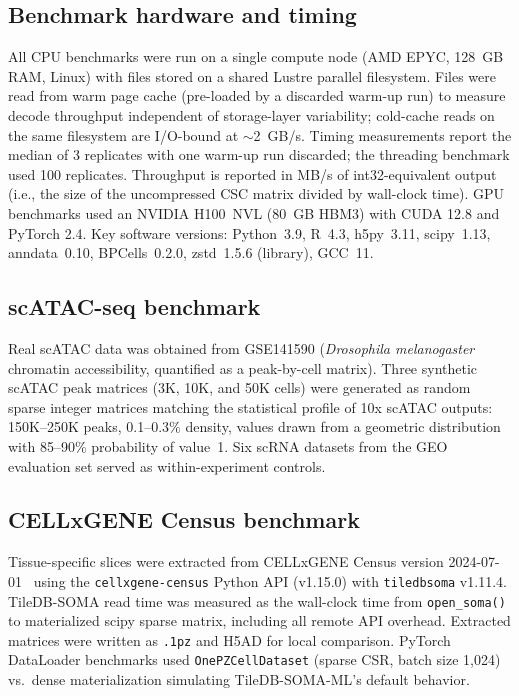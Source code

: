 \documentclass[10pt,twocolumn,letterpaper]{article}
\begin{document}
\subsection{Benchmark hardware and timing}

All CPU benchmarks were run on a single compute node (AMD EPYC, 128~GB RAM, Linux) with files stored on a shared Lustre parallel filesystem.
Files were read from warm page cache (pre-loaded by a discarded warm-up run) to measure decode throughput independent of storage-layer variability; cold-cache reads on the same filesystem are I/O-bound at $\sim$2~GB/s.
Timing measurements report the median of 3 replicates with one warm-up run discarded; the threading benchmark used 100 replicates.
Throughput is reported in MB/s of int32-equivalent output (i.e., the size of the uncompressed CSC matrix divided by wall-clock time).
GPU benchmarks used an NVIDIA H100~NVL (80~GB HBM3) with CUDA 12.8 and PyTorch 2.4.
Key software versions: Python~3.9, R~4.3, h5py~3.11, scipy~1.13, anndata~0.10, BPCells~0.2.0, zstd~1.5.6 (library), GCC~11.

\subsection{scATAC-seq benchmark}

Real scATAC data was obtained from GSE141590 (\textit{Drosophila melanogaster} chromatin accessibility, quantified as a peak-by-cell matrix).
Three synthetic scATAC peak matrices (3K, 10K, and 50K cells) were generated as random sparse integer matrices matching the statistical profile of 10x scATAC outputs: 150K--250K peaks, 0.1--0.3\% density, values drawn from a geometric distribution with 85--90\% probability of value~1.
Six scRNA datasets from the GEO evaluation set served as within-experiment controls.

\subsection{CELLxGENE Census benchmark}

Tissue-specific slices were extracted from CELLxGENE Census version 2024-07-01~\cite{chanzuckerberg2021cellxgene} using the \texttt{cellxgene-census} Python API (v1.15.0) with \texttt{tiledbsoma} v1.11.4.
TileDB-SOMA read time was measured as the wall-clock time from \texttt{open\_soma()} to materialized scipy sparse matrix, including all remote API overhead.
Extracted matrices were written as \texttt{.1pz} and H5AD for local comparison.
PyTorch DataLoader benchmarks used \texttt{OnePZCellDataset} (sparse CSR, batch size 1{,}024) vs.\ dense materialization simulating TileDB-SOMA-ML's default behavior.
\end{document}

